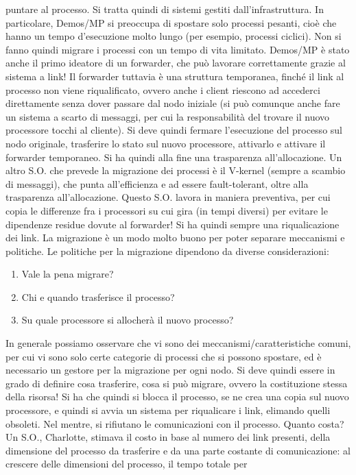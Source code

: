 puntare al processo. Si tratta quindi di sistemi gestiti dall'infrastruttura.
In particolare, Demos/MP si preoccupa di spostare solo processi pesanti, cioè che hanno un tempo d'esecuzione molto
lungo (per esempio, processi ciclici).
Non si fanno quindi migrare i processi con un tempo di vita limitato.
Demos/MP è stato anche il primo ideatore di un forwarder, che può lavorare correttamente grazie al sistema a link! Il
forwarder tuttavia è una struttura temporanea, finché il link al processo non viene riqualificato, ovvero anche i
client riescono ad accederci direttamente senza dover passare dal nodo iniziale (si può comunque anche fare un sistema a
scarto di messaggi, per cui la responsabilità del trovare il nuovo processore tocchi al cliente). Si deve quindi
fermare l'esecuzione del processo sul nodo originale, trasferire lo stato sul nuovo processore, attivarlo e attivare il
forwarder temporaneo. Si ha quindi alla fine una trasparenza all'allocazione.
Un altro S.O. che prevede la migrazione dei processi è il V-kernel (sempre a scambio di messaggi), che punta
all'efficienza e ad essere fault-tolerant, oltre alla trasparenza all'allocazione. Questo S.O. lavora in maniera
preventiva, per cui copia le differenze fra i processori su cui gira (in tempi diversi) per evitare le dipendenze
residue dovute al forwarder! Si ha quindi sempre una riqualicazione dei link.
La migrazione è un modo molto buono per poter separare meccanismi e politiche. Le politiche per la migrazione dipendono
da diverse considerazioni:
\begin{enumerate}
 \item Vale la pena migrare?
 \item Chi e quando trasferisce il processo?
 \item Su quale processore si allocherà il nuovo processo?
\end{enumerate}
In generale possiamo osservare che vi sono dei meccanismi/caratteristiche comuni, per cui vi sono solo certe categorie
di processi che si possono spostare, ed è necessario un gestore per la migrazione per ogni nodo. Si deve quindi essere
in grado di definire cosa trasferire, cosa si può migrare, ovvero la costituzione stessa della risorsa! Si ha che quindi
si blocca il processo, se ne crea una copia sul nuovo processore, e quindi si avvia un sistema per riqualicare i link,
elimando quelli obsoleti. Nel mentre, si rifiutano le comunicazioni con il processo.
Quanto costa? Un S.O., Charlotte, stimava il costo in base al numero dei link presenti, della dimensione del processo da
trasferire e da una parte costante di comunicazione: al crescere delle dimensioni del processo, il tempo totale per
